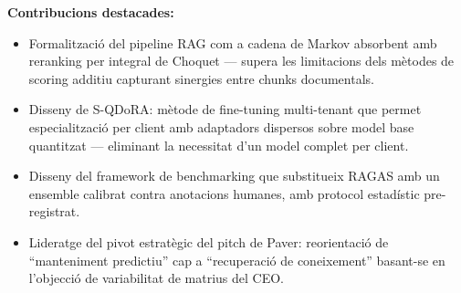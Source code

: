 \documentclass[11pt,a4paper]{article}
\begin{document}
\begin{profilebox}[title={\large\bfseries\color{dark} Oriol Farrés i Vilar \hfill \normalsize CEO / CFO}]
\vspace{0.3em}
\small\textbf{Contribucions destacades:}
\begin{itemize}[leftmargin=1.2em,itemsep=1pt]
\item Formalització del pipeline RAG com a cadena de Markov absorbent amb reranking per integral de Choquet --- supera les limitacions dels mètodes de scoring additiu capturant sinergies entre chunks documentals.
\item Disseny de S-QDoRA: mètode de fine-tuning multi-tenant que permet especialització per client amb adaptadors dispersos sobre model base quantitzat --- eliminant la necessitat d'un model complet per client.
\item Disseny del framework de benchmarking que substitueix RAGAS amb un ensemble calibrat contra anotacions humanes, amb protocol estadístic pre-registrat.
\item Lideratge del pivot estratègic del pitch de Paver: reorientació de ``manteniment predictiu'' cap a ``recuperació de coneixement'' basant-se en l'objecció de variabilitat de matrius del CEO.
\end{itemize}
\end{profilebox}

\vspace{1em}

\end{document}
